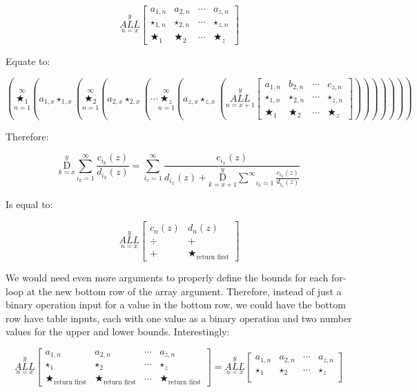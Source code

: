\documentclass{article}
\begin{document}
$$\underset{n=x}{\overset{y}{ALL}}
\begin{bmatrix}
a_{1,n} & a_{2,n} & \cdots & a_{z,n} \\
\star_{1,n} & \star_{2,n} & \cdots & \star_{z,n} \\ \bigstar_{1} & \bigstar_{2} & \cdots & \bigstar_{z}
\end{bmatrix}$$

Equate to:

$$(\underset{n=1}{\overset{\infty}{\bigstar_1}}(a_{1,x} \star_{1,x} (\underset{n=1}{\overset{\infty}{\bigstar_2}} (a_{2, x} \star_{2,x} (\cdots \underset{n=1}{\overset{\infty}{\bigstar_z}} (a_{z,x} \star_{z,x} (\underset{n=x+1}{\overset{y}{ALL}}
\begin{bmatrix}
a_{1,n} & b_{2,n} & \cdots & c_{z,n} \\
\star_{1,n} & \star_{2,n} & \cdots & \star_{z,n} \\ \bigstar_{1} & \bigstar_{2} & \cdots & \bigstar_{z}
\end{bmatrix})))))))$$

Therefore:

$$\underset{k=x}{\overset{y}{ \mathrm D}} \underset{i_k=1}{\overset{\infty}{ \sum}} \frac{c_{i_k} (z)}{d_{i_k} (z)} = \underset{i_x=1}{\overset{\infty}{ \sum}} \frac{c_{i_x}(z)}{d_{i_x}(z)+ \underset{k=x+1}{\overset{y}{ \mathrm D}} \underset{i_k=1}{\overset{\infty}{ \sum}} \frac{c_{i_k} (z)}{d_{i_k} (z)}}$$

Is equal to:

$$\underset{n=x}{\overset{y}{ALL}}
\begin{bmatrix}
c_n(z) & d_n(z) \\
\div & + \\ + & \bigstar_{\text{return first}}
\end{bmatrix}$$

We would need even more arguments to properly define the bounds for each for-loop at the new bottom row of the array argument. Therefore, instead of just a binary operation input for a value in the bottom row, we could have the bottom row have table inputs, each with one value as a binary operation and two number values for the upper and lower bounds. Interestingly:

$$\underset{n=x}{\overset{y}{ALL}}
\begin{bmatrix}
a_{1,n} & a_{2,n} & \cdots & a_{z,n} \\
\star_1 & \star_2 & \cdots & \star_z \\ \bigstar_{\text{return first}} & \bigstar_{\text{return first}} & \cdots & \bigstar_{\text{return first}}
\end{bmatrix}=\underset{n=x}{\overset{y}{ALL}}
\begin{bmatrix}
a_{1,n} & a_{2,n} & \cdots & a_{z,n} \\
\star_1 & \star_2 & \cdots & \star_z \\
\end{bmatrix}$$
\end{document}
